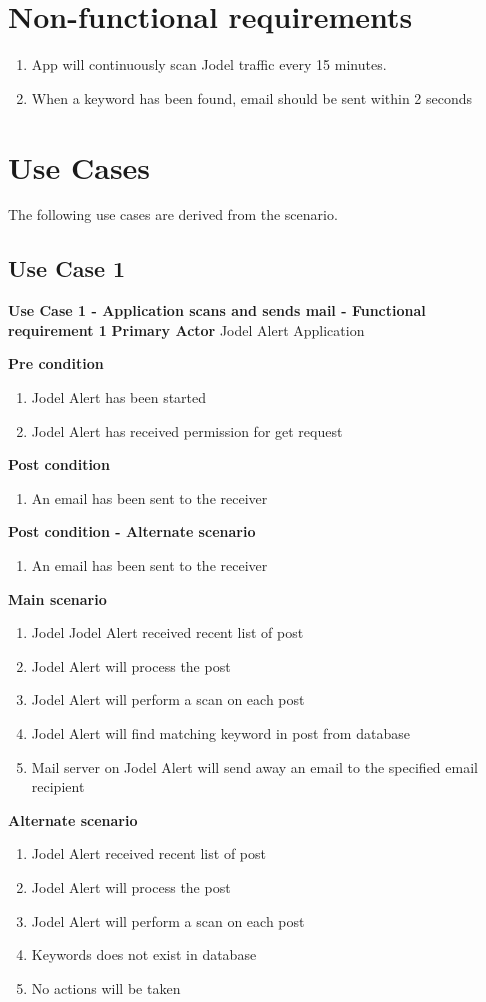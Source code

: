 \documentclass[a4paper,12pt]{article}
\begin{document}
\section{Non-functional requirements}
\begin{enumerate}
	\item App will continuously scan Jodel traffic every 15 minutes.
	\item When a keyword has been found, email should be sent within 2 seconds
\end{enumerate}
\section{Use Cases}
The following use cases are derived from the scenario.
\subsection{Use Case 1}
\textbf{Use Case 1 - Application scans and sends mail - Functional requirement 1}
\textbf{Primary Actor}
Jodel Alert Application

\textbf{Pre condition}
\begin{enumerate}
	\item Jodel Alert has been started
	\item Jodel Alert has received permission for get request
\end{enumerate}
\textbf{Post condition}
\begin{enumerate}
	\item An email has been sent to the receiver
\end{enumerate}
\textbf{Post condition - Alternate scenario}
\begin{enumerate}
	\item An email has been sent to the receiver
\end{enumerate}
\textbf{Main scenario}
\begin{enumerate}
	\item Jodel Jodel Alert received recent list of post
	\item Jodel Alert will process the post
	\item Jodel Alert will perform a scan on each post
	\item Jodel Alert will find matching keyword in post from database 
	\item Mail server on Jodel Alert will send away an email to the specified email recipient
\end{enumerate}
\textbf{Alternate scenario}
\begin{enumerate}
	\item Jodel Alert received recent list of post
	\item Jodel Alert will process the post
	\item Jodel Alert will perform a scan on each post
	\item Keywords does not exist in database
	\item No actions will be taken
\end{enumerate}
\end{document}
